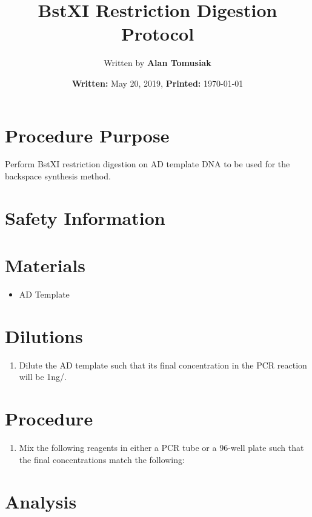 \documentclass{ssiBio}
\title{BstXI Restriction Digestion Protocol}
\author{Written by \textbf{Alan Tomusiak}}
\date{\textbf{Written:} May 20, 2019, \textbf{Printed:} \today{}}
\begin{document}
\maketitle
\section{Procedure Purpose}
Perform BstXI restriction digestion on AD template DNA to be used for the backspace synthesis method. 

\section{Safety Information}
\begin{safety}
  \begin{enumerate}
    \SYBRGOLD
  \end{enumerate}
\end{safety}

\section{Materials}
\begin{itemize}
  \item{AD Template}
\end{itemize}

\section{Dilutions}
\begin{enumerate}
  \item{Dilute the AD template such that its final concentration in the PCR reaction will be 1ng/\uL.}
\end{enumerate}

\section{Procedure}
\begin{enumerate}
  \item{Mix the following reagents in either a PCR tube or a 96-well plate such that the final concentrations match the following:}

\end{enumerate}

\section{Analysis}



\end{document}
